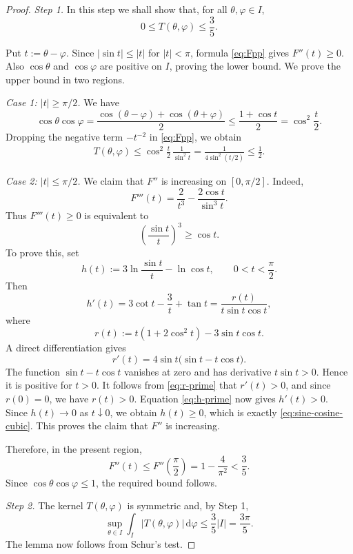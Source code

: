\documentclass[11pt]{article}
\theoremstyle{definition}
\theoremstyle{remark}
\newcommand{\abs}[1]{\left\lvert #1\right\rvert}
\newcommand{\dd}{\,\mathrm{d}}
\begin{document}
\begin{proof}
    \emph{Step 1.} In this step we shall show that, for all $\theta,\varphi\in I$,
    \begin{equation}\label{eq:k-bound}
        0\leq T(\theta,\varphi)\leq\frac35.
    \end{equation}

Put $t:=\theta-\varphi$.  Since $\abs{\sin t}\leq\abs t$ for $\abs t<\pi$, formula \eqref{eq:Fpp} gives $F''(t)\geq0$.  Also $\cos\theta$ and $\cos\varphi$ are positive on $I$, proving the lower bound. We prove the upper bound in two regions.

\smallskip
\noindent\emph{Case 1: $\abs t\geq\pi/2$.}
We have
\begin{equation}\label{eq:cos-product-bound}
\cos\theta\cos\varphi = \frac{\cos(\theta-\varphi)+\cos(\theta+\varphi)}{2}
\leq \frac{1+\cos t}{2}
=\cos^2\frac t2.
\end{equation}
Dropping the negative term $-t^{-2}$ in \eqref{eq:Fpp}, we obtain
\begin{align*}
T(\theta,\varphi)
\leq \cos^2\frac t2\,\frac{1}{\sin^2t}
=\frac{1}{4\sin^2(t/2)}
\leq\frac12.
\end{align*}

\smallskip
\noindent\emph{Case 2: $\abs t\leq\pi/2$.}
We claim that $F''$ is increasing on $[0,\pi/2]$.  Indeed,
\begin{equation}\label{eq:F-third}
F'''(t)=\frac{2}{t^3}-\frac{2\cos t}{\sin^3t}.
\end{equation}
Thus $F'''(t)\geq0$ is equivalent to
\begin{equation}\label{eq:sine-cosine-cubic}
\left(\frac{\sin t}{t}\right)^3\geq\cos t.
\end{equation}
To prove this, set
\[
h(t):=3\ln\frac{\sin t}{t}-\ln\cos t,
\qquad 0<t<\frac{\pi}{2}.
\]
Then
\begin{equation}\label{eq:h-prime}
h'(t)=3\cot t-\frac3t+\tan t
=\frac{r(t)}{t\sin t\cos t},
\end{equation}
where
\[
r(t):=t(1+2\cos^2t)-3\sin t\cos t.
\]
A direct differentiation gives
\begin{equation}\label{eq:r-prime}
r'(t)=4\sin t\bigl(\sin t-t\cos t\bigr).
\end{equation}
The function $\sin t-t\cos t$ vanishes at zero and has derivative $t\sin t>0$.  Hence it is positive for $t>0$.  It follows from \eqref{eq:r-prime} that $r'(t)>0$, and since $r(0)=0$, we have $r(t)>0$.  Equation \eqref{eq:h-prime} now gives $h'(t)>0$.  Since $h(t)\to0$ as $t\downarrow0$, we obtain $h(t)\geq0$, which is exactly \eqref{eq:sine-cosine-cubic}.  This proves the claim that $F''$ is increasing.

Therefore, in the present region,
\[
F''(t)\leq F''\left(\frac{\pi}{2}\right)
=1-\frac{4}{\pi^2}<\frac35.
\]
Since $\cos\theta\cos\varphi\leq1$, the required bound follows.

\medskip

\emph{Step 2.} The kernel $T(\theta,\varphi)$ is symmetric and, by Step 1,
\[
\sup_{\theta\in I}\int_I\abs{T(\theta,\varphi)}\dd\varphi
\leq \frac35\abs I=\frac{3\pi}{5}.
\]
The lemma now follows from Schur's test.
\end{proof}
\end{document}
